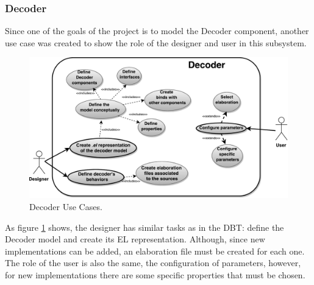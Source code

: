 \subsubsection{Decoder}

Since one of the goals of the project is to model the Decoder component, another use case was created to show the role of the designer and user in this subsystem. 

\begin{figure}[!htb]
\centerline{
\includegraphics[scale=0.65]{images/Decoder_UseCases.pdf} }
\caption{Decoder Use Cases.}
\label{fig:DecoderUseCases} 
\end{figure}

As figure \ref{fig:DecoderUseCases} shows, the designer has similar tasks as in the DBT: define the Decoder model and create its EL representation. Although, since new implementations can be added, an elaboration file must be created for each one. The role of the user is also the same, the configuration of parameters, however, for new implementations there are some specific properties that must be chosen.
